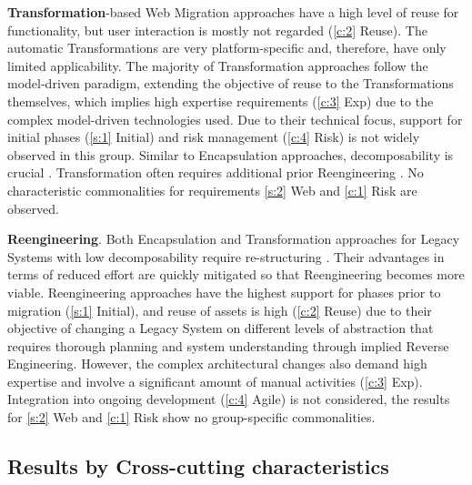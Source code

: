 \textbf{Transformation}-based \gls{Web Migration} approaches have a high level of reuse for functionality, but user interaction is mostly not regarded (\cref{c:2} Reuse).
The automatic \glspl{Transformation} are very platform-specific and, therefore, have only limited applicability.
The majority of \gls{Transformation} approaches follow the model-driven paradigm, extending the objective of reuse to the \glspl{Transformation} themselves, which implies high expertise requirements (\cref{c:3} Exp) due to the complex model-driven technologies used.
Due to their technical focus, support for initial phases (\cref{s:1} Initial) and \gls{risk management} (\cref{c:4} Risk) is not widely observed in this group.
Similar to \gls{Encapsulation} approaches, decomposability is crucial \autocite{Khadka2016PHD,Khadka2013SurveySOAMigration,Lucia2008,Lucia2006}.
\gls{Transformation} often requires additional prior \gls{Reengineering}  \autocite{Nasr2010}.
No characteristic commonalities for requirements \cref{s:2} Web and \cref{c:1} Risk are observed.

\textbf{\gls{Reengineering}}. Both \gls{Encapsulation} and \gls{Transformation} approaches for \glspl{Legacy System} with low decomposability require re-structuring \autocite{Nasr2010,Aversano2001,Wagner2014,Khadka2016PHD,Khadka2013SurveySOAMigration,Lucia2008,Lucia2006}.
Their advantages in terms of reduced effort are quickly mitigated so that \gls{Reengineering} becomes more viable.
\gls{Reengineering} approaches have the highest support for phases prior to migration (\cref{s:1} Initial), and reuse of  assets is high (\cref{c:2} Reuse) due to their objective of changing a \gls{Legacy System} on different levels of abstraction that requires thorough planning and system understanding through implied \gls{Reverse Engineering}.
However, the complex architectural changes also demand high expertise and involve a significant amount of manual activities (\cref{c:3} Exp).
Integration into ongoing development (\cref{c:4} Agile) is not considered, the results for \cref{s:2} Web and \cref{c:1} Risk show no group-specific commonalities.

\vspace{-10pt}
\hypertarget{sec:sota.discussion.crosscutting}{%
\subsection{Results by Cross-cutting characteristics}\label{sec:sota.discussion.crosscutting}}
\vspace{10pt}

